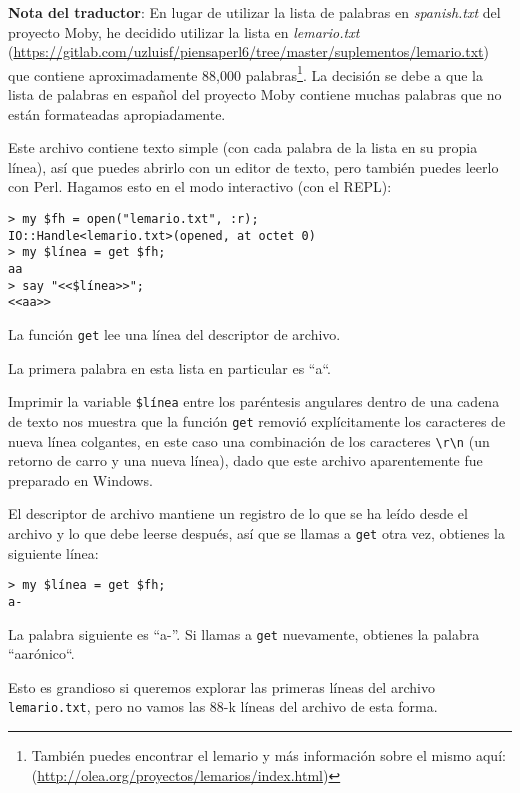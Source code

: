 \begin{description}
\item {\bf Nota del traductor}: En lugar de utilizar la lista de palabras en \emph{spanish.txt}
del proyecto Moby, he decidido utilizar la lista en \emph{lemario.txt} (\url{https://gitlab.com/uzluisf/piensaperl6/tree/master/suplementos/lemario.txt}) 
que contiene aproximadamente 88,000 palabras\footnote{
También puedes encontrar el lemario y más información sobre el mismo aquí: (\url{http://olea.org/proyectos/lemarios/index.html})}. La decisión se debe a que la lista de 
palabras en español del proyecto Moby contiene muchas palabras que no están
formateadas apropiadamente. 
\end{description}

Este archivo contiene texto simple (con cada palabra de la lista
en su propia línea), así que puedes abrirlo con un editor de texto,
pero también puedes leerlo con Perl. Hagamos esto en el modo
interactivo (con el REPL):

\begin{verbatim}
> my $fh = open("lemario.txt", :r);
IO::Handle<lemario.txt>(opened, at octet 0)
> my $línea = get $fh;
aa
> say "<<$línea>>";
<<aa>>
\end{verbatim}

La función {\tt get} lee una línea del descriptor de archivo.

La primera palabra en esta lista en particular es ``a``.

Imprimir la variable \verb|$línea| entre los paréntesis angulares
dentro de una cadena de texto nos muestra que la función {\tt get}
removió explícitamente los caracteres de nueva línea colgantes, en este
caso una combinación de los caracteres \verb|\r\n| (un retorno de carro
 y una nueva línea), dado que este archivo aparentemente fue preparado en Windows.

El descriptor de archivo mantiene un registro de lo que se ha leído
desde el archivo y lo que debe leerse después, así que se llamas
a {\tt get} otra vez, obtienes la siguiente línea:

\begin{verbatim}
> my $línea = get $fh;
a-
\end{verbatim}
%
La palabra siguiente es ``a-''. Si llamas a {\tt get} nuevamente,
obtienes la palabra ``aarónico``. 

Esto es grandioso si queremos explorar las primeras líneas del
archivo {\tt lemario.txt}, pero no vamos las 88-k líneas del 
archivo de esta forma.

